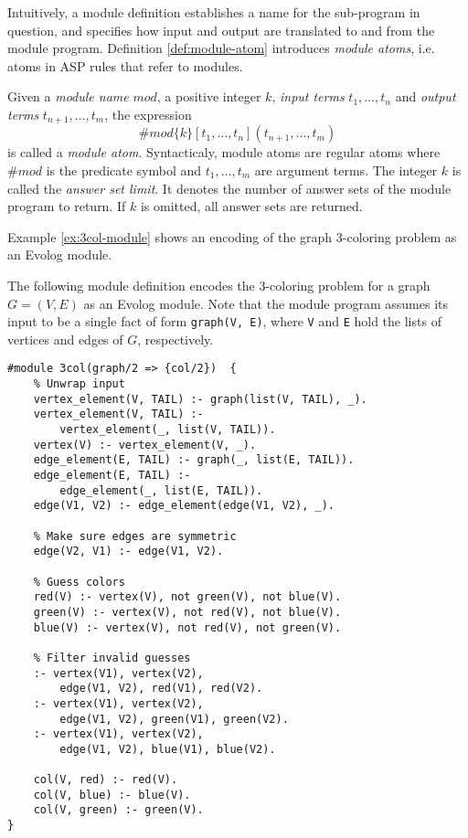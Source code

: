 Intuitively, a module definition establishes a name for the sub-program in question, and specifies how input and output are translated to and from the module program. Definition \ref{def:module-atom} introduces \emph{module atoms}, i.e. atoms in ASP rules that refer to modules.

\begin{definition}
\label{def:module-atom}
Given a \emph{module name} $\mathit{mod}$, a positive integer $k$, \emph{input terms} $t_1,\ldots,t_n$ and \emph{output terms} $t_{n+1},\ldots,t_m$, the expression
\[
	\#\mathit{mod}\{k\}[t_1,\ldots,t_n](t_{n+1},\ldots,t_m)
\]
is called a \emph{module atom}. Syntacticaly, module atoms are regular atoms where $\#\mathit{mod}$ is the predicate symbol and $t_1,\ldots,t_m$ are argument terms. The integer $k$ is called the \emph{answer set limit}. It denotes the number of answer sets of the module program to return. If $k$ is omitted, all answer sets are returned.
\end{definition}

Example \ref{ex:3col-module} shows an encoding of the graph 3-coloring problem as an Evolog module.

\begin{example}
\label{ex:3col-module}
The following module definition encodes the 3-coloring problem for a graph $G = (V, E)$ as an Evolog module. Note that the module program assumes its input to be a single fact of form \texttt{graph(V, E)}, where \texttt{V} and \texttt{E} hold the lists of vertices and edges of $G$, respectively.
\begin{lstlisting}[style=asp-code, label={lst:3col-module}]
#module 3col(graph/2 => {col/2})  {
	% Unwrap input
	vertex_element(V, TAIL) :- graph(list(V, TAIL), _).
	vertex_element(V, TAIL) :- 
		vertex_element(_, list(V, TAIL)).
	vertex(V) :- vertex_element(V, _).
	edge_element(E, TAIL) :- graph(_, list(E, TAIL)).
	edge_element(E, TAIL) :- 
		edge_element(_, list(E, TAIL)).
	edge(V1, V2) :- edge_element(edge(V1, V2), _).
	
	% Make sure edges are symmetric
	edge(V2, V1) :- edge(V1, V2).
	
	% Guess colors
	red(V) :- vertex(V), not green(V), not blue(V).
	green(V) :- vertex(V), not red(V), not blue(V).
	blue(V) :- vertex(V), not red(V), not green(V).
	
	% Filter invalid guesses
	:- vertex(V1), vertex(V2), 
		edge(V1, V2), red(V1), red(V2).
	:- vertex(V1), vertex(V2), 
		edge(V1, V2), green(V1), green(V2).
	:- vertex(V1), vertex(V2), 
		edge(V1, V2), blue(V1), blue(V2).
	
	col(V, red) :- red(V).
	col(V, blue) :- blue(V).
	col(V, green) :- green(V).
}	
\end{lstlisting}	
\end{example}	

